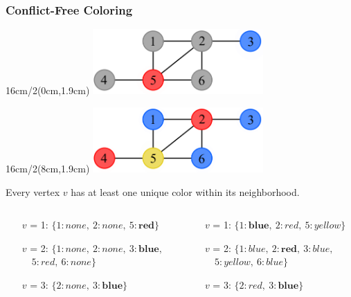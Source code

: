 \documentclass[xcolor=dvipsnames,aspectratio=1610]{beamer}
\newcommand{\exampleheight}{1.9cm}
\newcommand{\examplewidth}{16cm}
\begin{document}
  \begin{frame}
    \frametitle{Conflict-Free Coloring}

    \begin{textblock*}{\examplewidth/2}(0cm,\exampleheight) %
      \centering
      \includegraphics[width=6.5cm]{../figures/example-cfcp.pdf}
    \end{textblock*}

    \begin{textblock*}{\examplewidth/2}(8cm,\exampleheight) %
      \centering
      \includegraphics[width=6.5cm]{../figures/example-vcp.pdf}
    \end{textblock*}

    \vspace{3cm}

    \begin{center}
      Every vertex $v$ has at least one unique color within its neighborhood.
    \end{center}

    \begin{columns}

      \pause

      \begin{column}{0.5\textwidth}
        \begin{itemize}[leftmargin=1.4cm]
          \item[$v$ = 1:] $\{1: none,\ 2: none,\ 5: \textbf{red}\}$
          \item[$v$ = 2:] $\{1: none,\ 2: none,\ 3: \textbf{blue},$ \newline $\quad 5: red,\ 6: none\}$
          \item[$v$ = 3:] $\{2: none,\ 3: \textbf{blue}\}$
        \end{itemize}
      \end{column}

      \pause

      \begin{column}{0.5\textwidth}
        \begin{itemize}[leftmargin=1.4cm]
          \item[$v$ = 1:] $\{1: \textbf{blue},\ 2: red,\ 5: yellow\}$
          \item[$v$ = 2:] $\{1: blue,\ 2: \textbf{red},\ 3: blue,$ \newline $\quad 5: yellow,\ 6: blue\}$
          \item[$v$ = 3:] $\{2: red,\ 3: \textbf{blue}\}$
        \end{itemize}
      \end{column}


\end{columns}
\end{frame}
\end{document}
